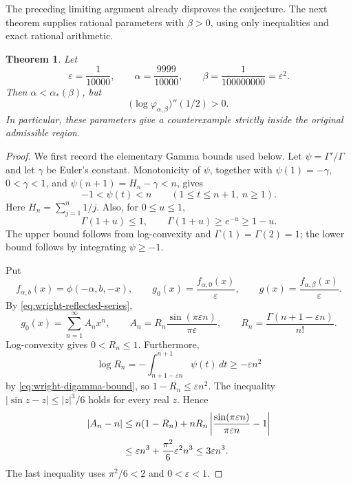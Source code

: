 \documentclass[11pt,a4paper]{article}
\newtheorem{theorem}{Theorem}[section]
\theoremstyle{definition}
\theoremstyle{remark}
\numberwithin{equation}{section}
\begin{document}
The preceding limiting argument already disproves the conjecture.
The next theorem supplies rational parameters with $\beta>0$, using
only inequalities and exact rational arithmetic.

\begin{theorem}
\label{thm:wright-interior}
Let
\[
 \varepsilon=\frac1{10000},\qquad
 \alpha=\frac{9999}{10000},\qquad
 \beta=\frac1{100000000}=\varepsilon^2.
\]
Then $\alpha<\alpha_*(\beta)$, but
\[
 \bigl(\log\varphi_{\alpha,\beta}\bigr)''(1/2)>0.
\]
In particular, these parameters give a counterexample strictly inside
the original admissible region.
\end{theorem}

\begin{proof}
We first record the elementary Gamma bounds used below. Let
$\psi=\Gamma'/\Gamma$ and let $\gamma$ be Euler's constant.
Monotonicity of $\psi$, together with
$\psi(1)=-\gamma$, $0<\gamma<1$, and
$\psi(n+1)=H_n-\gamma<n$, gives
\begin{equation}
 -1<\psi(t)<n\qquad(1\leq t\leq n+1,\ n\geq1).
 \label{eq:wright-digamma-bound}
\end{equation}
Here $H_n=\sum_{j=1}^n1/j$. Also, for $0\leq u\leq1$,
\begin{equation}
 \Gamma(1+u)\leq1,
 \qquad
 \Gamma(1+u)\geq e^{-u}\geq1-u.
 \label{eq:wright-gamma-unit-bounds}
\end{equation}
The upper bound follows from log-convexity and
$\Gamma(1)=\Gamma(2)=1$; the lower bound follows by integrating
$\psi\geq-1$.

Put
\[
 f_{\alpha,b}(x)=\phi(-\alpha,b,-x),\qquad
 g_0(x)=\frac{f_{\alpha,0}(x)}{\varepsilon},\qquad
 g(x)=\frac{f_{\alpha,\beta}(x)}{\varepsilon}.
\]
By \eqref{eq:wright-reflected-series},
\[
 g_0(x)=\sum_{n=1}^{\infty}A_nx^n,\qquad
 A_n=R_n\frac{\sin(\pi\varepsilon n)}{\pi\varepsilon},\qquad
 R_n=\frac{\Gamma(n+1-\varepsilon n)}{n!}.
\]
Log-convexity gives $0<R_n\leq1$. Furthermore,
\[
 \log R_n
 =-\int_{n+1-\varepsilon n}^{n+1}\psi(t)\,dt
 \geq-\varepsilon n^2
\]
by \eqref{eq:wright-digamma-bound}, so
$1-R_n\leq\varepsilon n^2$. The inequality
$|\sin z-z|\leq|z|^3/6$ holds for every real $z$. Hence
\begin{align}
 |A_n-n|
 &\leq n(1-R_n)
   +nR_n\left|\frac{\sin(\pi\varepsilon n)}
                         {\pi\varepsilon n}-1\right| \notag\\
 &\leq\varepsilon n^3+\frac{\pi^2}{6}\varepsilon^2n^3
 \leq3\varepsilon n^3.
 \label{eq:wright-coefficient-error}
\end{align}
The last inequality uses $\pi^2/6<2$ and $0<\varepsilon<1$.


\end{proof}
\end{document}
